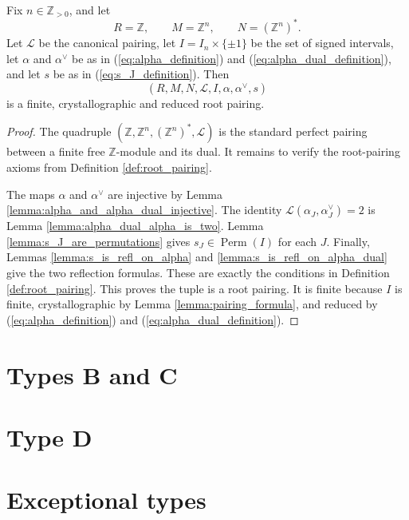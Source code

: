 \begin{theorem}\label{thm:root_pairing_of_type_A}
\leanok
Fix $n\in\mathbb{Z}_{>0}$, and let
\[
    R=\mathbb{Z},\qquad M=\mathbb{Z}^n,\qquad N=(\mathbb{Z}^n)^*.
\]
Let $\mathcal{L}$ be the canonical pairing, let
$I=I_n\times\{\pm1\}$ be the set of signed intervals, let $\alpha$ and
$\alpha^\vee$ be as in (\ref{eq:alpha_definition}) and
(\ref{eq:alpha_dual_definition}), and let $s$ be as in
(\ref{eq:s_J_definition}). Then
\[
    (R,M,N,\mathcal{L},I,\alpha,\alpha^\vee,s)
\]
is a finite, crystallographic and reduced root pairing.
\end{theorem}
\begin{proof}
    \leanok
The quadruple
$(\mathbb{Z},\mathbb{Z}^n,(\mathbb{Z}^n)^*,\mathcal{L})$ is the standard
perfect pairing between a finite free $\mathbb{Z}$-module and its dual.
It remains to verify the root-pairing axioms from Definition
\ref{def:root_pairing}.

The maps $\alpha$ and $\alpha^\vee$ are injective by Lemma
\ref{lemma:alpha_and_alpha_dual_injective}. The identity
$\mathcal{L}(\alpha_J,\alpha_J^\vee)=2$ is Lemma
\ref{lemma:alpha_dual_alpha_is_two}. Lemma
\ref{lemma:s_J_are_permutations} gives $s_J\in\operatorname{Perm}(I)$ for
each $J$. Finally, Lemmas \ref{lemma:s_is_refl_on_alpha} and
\ref{lemma:s_is_refl_on_alpha_dual} give the two reflection formulas.
These are exactly the conditions in Definition \ref{def:root_pairing}. This proves 
the tuple is a root pairing. It is finite because $I$ is finite, crystallographic by 
Lemma \ref{lemma:pairing_formula}, and reduced by 
(\ref{eq:alpha_definition}) and (\ref{eq:alpha_dual_definition}).
\end{proof}

\section{Types B and C}

\section{Type D}

\section{Exceptional types}

